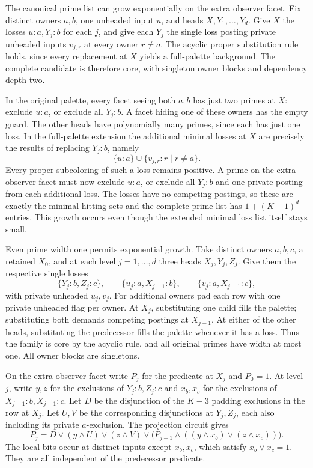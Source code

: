 The canonical prime list can grow exponentially on the
extra observer facet. Fix distinct owners $a,b$, one
unheaded input $u$, and heads $X,Y_1,\ldots,Y_d$.
Give $X$ the losses $u:a,Y_j:b$ for each $j$, and give
each $Y_j$ the single loss posting private unheaded
inputs $v_{j,r}$ at every owner $r\ne a$. The acyclic
proper substitution rule holds, since every replacement
at $X$ yields a full-palette background. The complete
candidate is therefore core, with singleton owner blocks
and dependency depth two.

In the original palette, every facet seeing both $a,b$
has just two primes at $X$: exclude $u:a$, or exclude
all $Y_j:b$. A facet hiding one of these owners has the
empty guard. The other heads have polynomially many
primes, since each has just one loss. In the full-palette
extension the additional minimal losses at $X$ are
precisely the results of replacing $Y_j:b$, namely
\[
             \{u:a\}\cup\{v_{j,r}:r\mid r\ne a\}.
\]
Every proper subcoloring of such a loss remains
positive. A prime on the extra observer facet must
now exclude $u:a$, or exclude all $Y_j:b$ and one
private posting from each additional loss. The losses
have no competing postings, so these are exactly the
minimal hitting sets and the complete prime list has
$1+(K-1)^d$ entries. This growth occurs even though
the extended minimal loss list itself stays small.

Even prime width one permits exponential growth. Take
distinct owners $a,b,c$, a retained $X_0$, and at each
level $j=1,\ldots,d$ three heads $X_j,Y_j,Z_j$.
Give them the respective single losses
\[
 \{Y_j:b,Z_j:c\},\qquad
 \{u_j:a,X_{j-1}:b\},\qquad
 \{v_j:a,X_{j-1}:c\},
\]
with private unheaded $u_j,v_j$. For additional owners
pad each row with one private unheaded flag per owner.
At $X_j$, substituting one child fills the palette;
substituting both demands competing postings at
$X_{j-1}$. At either of the other heads, substituting
the predecessor fills the palette whenever it has a
loss. Thus the family is core by the acyclic rule, and
all original primes have width at most one. All owner
blocks are singletons.

On the extra observer facet write $P_j$ for the predicate
at $X_j$ and $P_0=1$. At level $j$, write $y,z$ for
the exclusions of $Y_j:b,Z_j:c$ and $x_b,x_c$ for
the exclusions of $X_{j-1}:b,X_{j-1}:c$. Let $D$ be
the disjunction of the $K-3$ padding exclusions in
the row at $X_j$. Let $U,V$ be the corresponding
disjunctions at $Y_j,Z_j$, each also including its
private $a$-exclusion. The projection circuit gives
\[
        P_j=D\vee(y\wedge U)\vee(z\wedge V)
           \vee\bigl(P_{j-1}\wedge
                  ((y\wedge x_b)\vee(z\wedge x_c))\bigr).
\]
The local bits occur at distinct inputs except $x_b,x_c$,
which satisfy $x_b\vee x_c=1$. They are all independent
of the predecessor predicate.

